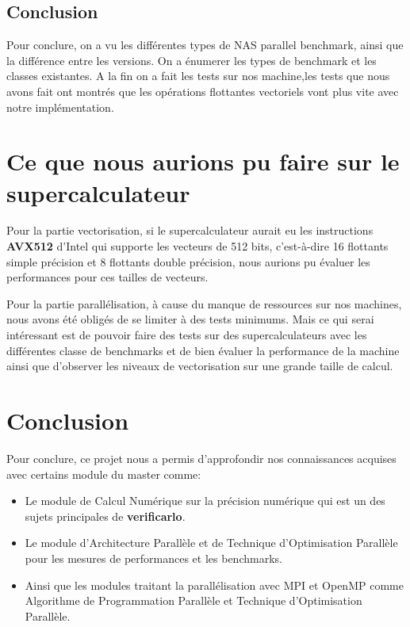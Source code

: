 \documentclass[11pt, letterpaper]{article}
\begin{document}
\subsection{Conclusion}
\label{sec:org77c8129}

Pour conclure, on a vu les différentes types de NAS parallel benchmark, ainsi que 
la différence entre les versions. On a énumerer les types de benchmark et les classes
existantes. A la fin on a fait les tests sur nos machine,les tests que nous avons fait 
ont montrés que les opérations flottantes vectoriels vont plus vite avec notre implémentation. 

\section{Ce que nous aurions pu faire sur le supercalculateur}
\label{sec:org69a9e47}

Pour la partie vectorisation, si le supercalculateur aurait eu les
instructions \textbf{AVX512} d'Intel qui supporte les vecteurs de 512 bits,
c'est-à-dire 16 flottants simple précision et 8 flottants double précision,
nous aurions pu évaluer les performances pour ces tailles de vecteurs.

Pour la partie parallélisation, à cause du manque de ressources sur nos
machines, nous avons été obligés de se limiter à des tests minimums. Mais ce
qui serai intéressant est de pouvoir faire des tests sur des supercalculateurs
avec les différentes classe de benchmarks et de bien évaluer la performance de
la machine ainsi que d'observer les niveaux de vectorisation sur une grande
taille de calcul.

\section{Conclusion}
\label{sec:org3a985e3}

Pour conclure, ce projet nous a permis d'approfondir nos connaissances acquises
avec certains module du master comme:
\begin{itemize}
\item Le module de Calcul Numérique sur la précision numérique qui est un des sujets
principales de \textbf{verificarlo}.
\item Le module d'Architecture Parallèle et de Technique d'Optimisation Parallèle
pour les mesures de performances et les benchmarks.
\item Ainsi que les modules traitant la parallélisation avec MPI et OpenMP comme
Algorithme de Programmation Parallèle et Technique d'Optimisation Parallèle.
\end{itemize}
\end{document}
